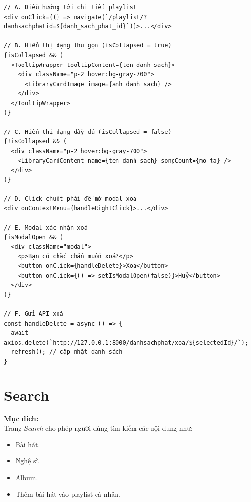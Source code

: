 \begin{enumerate}
\begin{verbatim}
// A. Điều hướng tới chi tiết playlist
<div onClick={() => navigate(`/playlist/?danhsachphatid=${danh_sach_phat_id}`)}>...</div>

// B. Hiển thị dạng thu gọn (isCollapsed = true)
{isCollapsed && (
  <TooltipWrapper tooltipContent={ten_danh_sach}>
    <div className="p-2 hover:bg-gray-700">
      <LibraryCardImage image={anh_danh_sach} />
    </div>
  </TooltipWrapper>
)}

// C. Hiển thị dạng đầy đủ (isCollapsed = false)
{!isCollapsed && (
  <div className="p-2 hover:bg-gray-700">
    <LibraryCardContent name={ten_danh_sach} songCount={mo_ta} />
  </div>
)}

// D. Click chuột phải để mở modal xoá
<div onContextMenu={handleRightClick}>...</div>

// E. Modal xác nhận xoá
{isModalOpen && (
  <div className="modal">
    <p>Bạn có chắc chắn muốn xoá?</p>
    <button onClick={handleDelete}>Xoá</button>
    <button onClick={() => setIsModalOpen(false)}>Huỷ</button>
  </div>
)}

// F. Gửi API xoá
const handleDelete = async () => {
  await axios.delete(`http://127.0.0.1:8000/danhsachphat/xoa/${selectedId}/`);
  refresh(); // cập nhật danh sách
}
\end{verbatim}
\end{enumerate}


\section{Search}

\textbf{Mục đích:} \\
Trang \textit{Search} cho phép người dùng tìm kiếm các nội dung như:
\begin{itemize}
  \item Bài hát.
  \item Nghệ sĩ.
  \item Album.
  \item Thêm bài hát vào playlist cá nhân.
\end{itemize}

